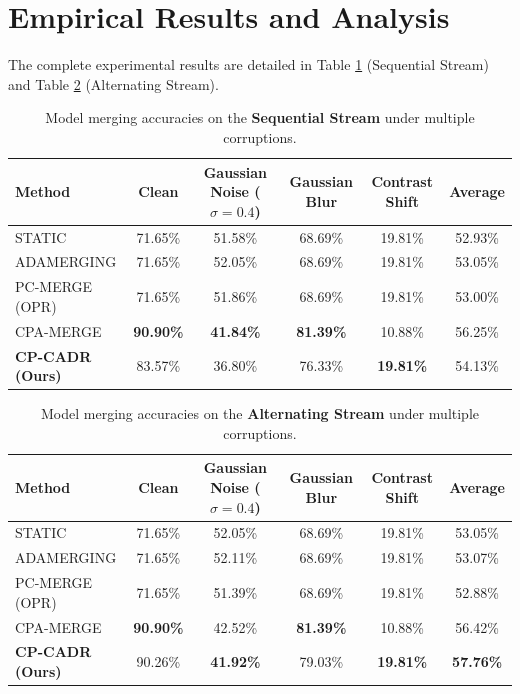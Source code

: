 \documentclass{article}
\theoremstyle{plain}
\theoremstyle{definition}
\theoremstyle{remark}
\begin{document}
\section{Empirical Results and Analysis}
\label{sec:results}
The complete experimental results are detailed in Table \ref{tab:seq} (Sequential Stream) and Table \ref{tab:alt} (Alternating Stream).

\begin{table}[t]
\caption{Model merging accuracies on the \textbf{Sequential Stream} under multiple corruptions.}
\label{tab:seq}
\begin{center}
\begin{small}
\begin{tabular}{lccccc}
\toprule
Method & Clean & Gaussian Noise ($\sigma = 0.4$) & Gaussian Blur & Contrast Shift & Average \\
\midrule
STATIC & 71.65\% & 51.58\% & 68.69\% & 19.81\% & 52.93\% \\
ADAMERGING & 71.65\% & 52.05\% & 68.69\% & 19.81\% & 53.05\% \\
PC-MERGE (OPR) & 71.65\% & 51.86\% & 68.69\% & 19.81\% & 53.00\% \\
CPA-MERGE & \textbf{90.90\%} & \textbf{41.84\%} & \textbf{81.39\%} & 10.88\% & 56.25\% \\
\textbf{CP-CADR (Ours)} & 83.57\% & 36.80\% & 76.33\% & \textbf{19.81\%} & 54.13\% \\
\bottomrule
\end{tabular}
\end{small}
\end{center}
\end{table}

\begin{table}[t]
\caption{Model merging accuracies on the \textbf{Alternating Stream} under multiple corruptions.}
\label{tab:alt}
\begin{center}
\begin{small}
\begin{tabular}{lccccc}
\toprule
Method & Clean & Gaussian Noise ($\sigma = 0.4$) & Gaussian Blur & Contrast Shift & Average \\
\midrule
STATIC & 71.65\% & 52.05\% & 68.69\% & 19.81\% & 53.05\% \\
ADAMERGING & 71.65\% & 52.11\% & 68.69\% & 19.81\% & 53.07\% \\
PC-MERGE (OPR) & 71.65\% & 51.39\% & 68.69\% & 19.81\% & 52.88\% \\
CPA-MERGE & \textbf{90.90\%} & 42.52\% & \textbf{81.39\%} & 10.88\% & 56.42\% \\
\textbf{CP-CADR (Ours)} & 90.26\% & \textbf{41.92\%} & 79.03\% & \textbf{19.81\%} & \textbf{57.76\%} \\
\bottomrule
\end{tabular}
\end{small}
\end{center}
\end{table}
\end{document}
